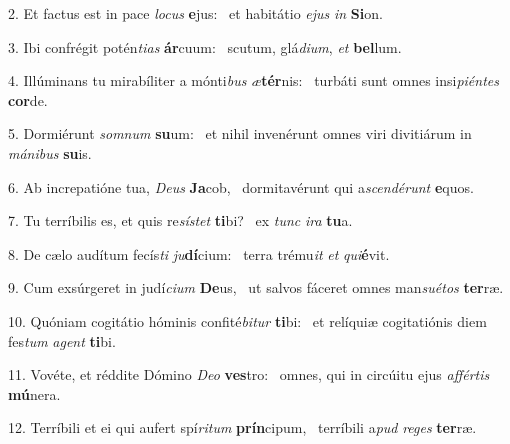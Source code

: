 2. Et factus est in pace \textit{lo}\textit{cus} \textbf{e}jus: \ast\  et habitátio \textit{e}\textit{jus} \textit{in} \textbf{Si}on.\

3. Ibi confrégit potén\textit{ti}\textit{as} \textbf{ár}cuum: \ast\  scutum, glá\textit{di}\textit{um}, \textit{et} \textbf{bel}lum.\

4. Illúminans tu mirabíliter a mónti\textit{bus} \textit{æ}\textbf{tér}nis: \ast\  turbáti sunt omnes insi\textit{pi}\textit{én}\textit{tes} \textbf{cor}de.\

5. Dormiérunt \textit{som}\textit{num} \textbf{su}um: \ast\  et nihil invenérunt omnes viri divitiárum in \textit{má}\textit{ni}\textit{bus} \textbf{su}is.\

6. Ab increpatióne tua, \textit{De}\textit{us} \textbf{Ja}cob, \ast\  dormitavérunt qui a\textit{scen}\textit{dé}\textit{runt} \textbf{e}quos.\

7. Tu terríbilis es, et quis re\textit{sís}\textit{tet} \textbf{ti}bi? \ast\  ex \textit{tunc} \textit{i}\textit{ra} \textbf{tu}a.\

8. De cælo audítum fecís\textit{ti} \textit{ju}\textbf{dí}cium: \ast\  terra trému\textit{it} \textit{et} \textit{qui}\textbf{é}vit.\

9. Cum exsúrgeret in judí\textit{ci}\textit{um} \textbf{De}us, \ast\  ut salvos fáceret omnes man\textit{su}\textit{é}\textit{tos} \textbf{ter}ræ.\

10. Quóniam cogitátio hóminis confité\textit{bi}\textit{tur} \textbf{ti}bi: \ast\  et relíquiæ cogitatiónis diem fes\textit{tum} \textit{a}\textit{gent} \textbf{ti}bi.\

11. Vovéte, et réddite Dómino \textit{De}\textit{o} \textbf{ves}tro: \ast\  omnes, qui in circúitu ejus \textit{af}\textit{fér}\textit{tis} \textbf{mú}nera.\

12. Terríbili et ei qui aufert spí\textit{ri}\textit{tum} \textbf{prín}cipum, \ast\  terríbili a\textit{pud} \textit{re}\textit{ges} \textbf{ter}ræ.\


